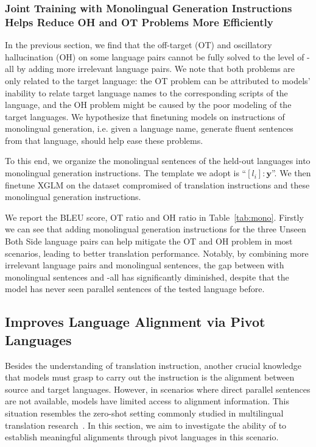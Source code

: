 \subsubsection{Joint Training with Monolingual Generation Instructions Helps Reduce OH and OT Problems More Efficiently}
\label{sec:mono}
In the previous section, we find that the off-target (OT) and oscillatory hallucination (OH) on some language pairs cannot be fully solved to the level of \methodend-all by adding more irrelevant language pairs. We note that both problems are only related to the target language: the OT problem can be attributed to models' inability to relate target language names to the corresponding scripts of the language, and the OH problem might be caused by the poor modeling of the target languages. We hypothesize that finetuning models on 
 instructions of monolingual generation, i.e. given a language name, generate fluent sentences from that language, should help ease these problems.

To this end, we organize the monolingual sentences of the held-out languages into monolingual generation instructions. The template we adopt is ``$[l_i]: \mathbf{y}$''. We then finetune XGLM on the dataset compromised of translation instructions and these monolingual generation instructions. 

We report the BLEU score, OT ratio and OH ratio in Table~\ref{tab:mono}.  Firstly we can see that adding monolingual generation instructions for the three Unseen Both Side language pairs can help mitigate the OT and OH problem in most scenarios, leading to better translation performance. Notably, by combining more irrelevant language pairs and monolingual sentences, the gap between  with monolingual sentences and \methodend-all has significantly diminished, despite that the model has never seen parallel sentences of the tested language before. 




\subsection{\method Improves Language Alignment via Pivot Languages}
\label{sec:language_alignment}




Besides the understanding of translation instruction, another crucial knowledge that models must grasp to carry out the instruction is the alignment between source and target languages. However, in scenarios where direct parallel sentences are not available, models have limited access to alignment information. This situation resembles the zero-shot setting commonly studied in multilingual translation research~\citep{gu-etal-2019-improved,zhang-etal-2020-improving,arivazhagan2019missing,liu-etal-2021-improving}. In this section, we aim to investigate the ability of \method to establish meaningful alignments through pivot languages in this scenario.


